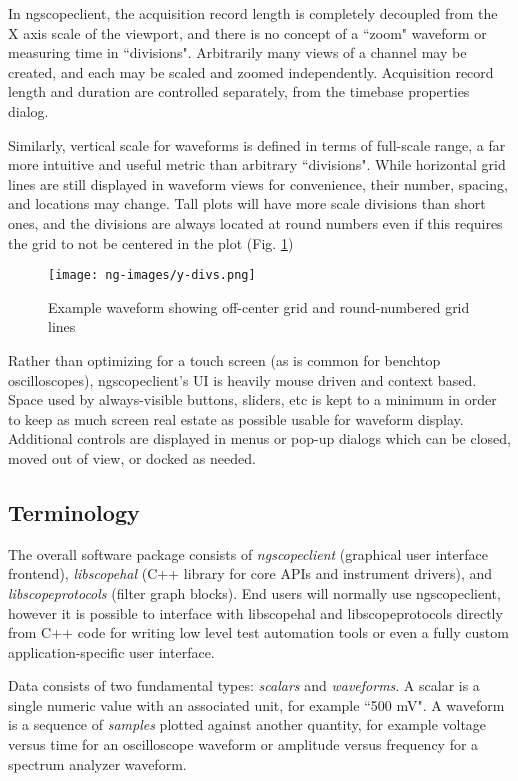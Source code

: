 In ngscopeclient, the acquisition record length is completely decoupled from the X axis scale of the viewport, and
there is no concept of a ``zoom" waveform or measuring time in ``divisions". Arbitrarily many views of a channel may be
created, and each may be scaled and zoomed independently. Acquisition record length and duration are controlled
separately, from the timebase properties dialog.

Similarly, vertical scale for waveforms is defined in terms of full-scale range, a far more intuitive and useful metric
than arbitrary ``divisions". While horizontal grid lines are still displayed in waveform views for convenience, their
number, spacing, and locations may change. Tall plots will have more scale divisions than short ones, and the divisions
are always located at round numbers even if this requires the grid to not be centered in the plot (Fig. \ref{y-divs})

\begin{figure}[h]
\centering
\texttt{[image: ng-images/y-divs.png]}
\caption{Example waveform showing off-center grid and round-numbered grid lines}
\label{y-divs}
\end{figure}

Rather than optimizing for a touch screen (as is common for benchtop oscilloscopes), ngscopeclient's UI is
heavily mouse driven and context based. Space used by always-visible buttons, sliders, etc is kept to a minimum in
order to keep as much screen real estate as possible usable for waveform display. Additional controls are displayed in
menus or pop-up dialogs which can be closed, moved out of view, or docked as needed.

\subsection{Terminology}

The overall software package consists of \emph{ngscopeclient} (graphical user interface frontend), \emph{libscopehal}
(C++ library for core APIs and instrument drivers), and \emph{libscopeprotocols} (filter graph blocks). End users will
normally use ngscopeclient, however it is possible to interface with libscopehal and libscopeprotocols directly from
C++ code for writing low level test automation tools or even a fully custom application-specific user interface.

Data consists of two fundamental types: \emph{scalars} and \emph{waveforms}. A scalar is a single numeric value with an
associated unit, for example ``500 mV". A waveform is a sequence of \emph{samples} plotted against another quantity, for
example voltage versus time for an oscilloscope waveform or amplitude versus frequency for a spectrum analyzer
waveform.

